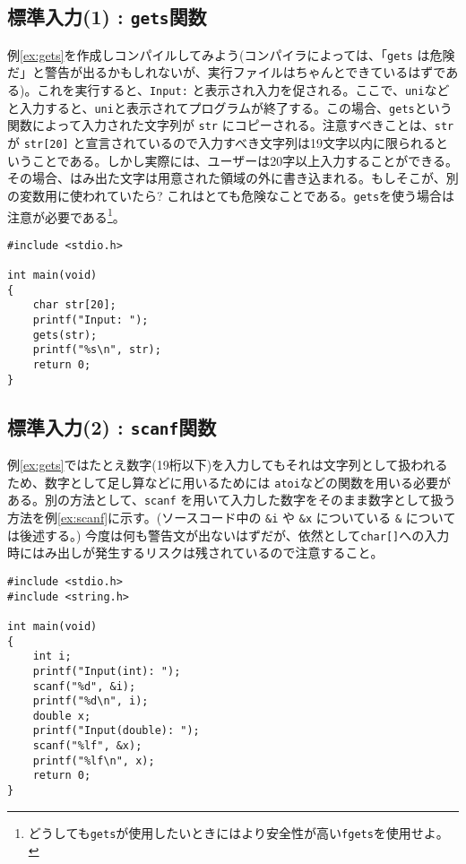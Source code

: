 \subsection{標準入力(1) : \texttt{gets}関数}
例\ref{ex:gets}を作成しコンパイルしてみよう(コンパイラによっては、「\texttt{gets} は危険だ」と警告が出るかもしれないが、実行ファイルはちゃんとできているはずである)。これを実行すると、\texttt{Input:} と表示され入力を促される。ここで、\texttt{uni}などと入力すると、\texttt{uni}と表示されてプログラムが終了する。この場合、\texttt{gets}という関数によって入力された文字列が \texttt{str} にコピーされる。注意すべきことは、\texttt{str} が \texttt{str[20]} と宣言されているので入力すべき文字列は19文字以内に限られるということである。しかし実際には、ユーザーは20字以上入力することができる。その場合、はみ出た文字は用意された領域の外に書き込まれる。もしそこが、別の変数用に使われていたら? これはとても危険なことである。\texttt{gets}を使う場合は注意が必要である\footnote{どうしても\texttt{gets}が使用したいときにはより安全性が高い\texttt{fgets}を使用せよ。}。
\begin{reidai}\label{ex:gets}
    \begin{verbatim}
#include <stdio.h>

int main(void)
{
    char str[20];
    printf("Input: ");
    gets(str);
    printf("%s\n", str);
    return 0;
}
\end{verbatim}
\end{reidai}

\subsection{標準入力(2) : \texttt{scanf}関数}
例\ref{ex:gets}ではたとえ数字(19桁以下)を入力してもそれは文字列として扱われるため、数字として足し算などに用いるためには \texttt{atoi}などの関数を用いる必要がある。別の方法として、\texttt{scanf} を用いて入力した数字をそのまま数字として扱う方法を例\ref{ex:scanf}に示す。(ソースコード中の \texttt{\&i} や \texttt{\&x} についている \texttt{\&} については後述する。)
今度は何も警告文が出ないはずだが、依然として\texttt{char[]}への入力時にはみ出しが発生するリスクは残されているので注意すること。
\begin{reidai}\label{ex:scanf}
    \begin{verbatim}
#include <stdio.h>
#include <string.h>

int main(void)
{
    int i;
    printf("Input(int): ");
    scanf("%d", &i);
    printf("%d\n", i);
    double x;
    printf("Input(double): ");
    scanf("%lf", &x);
    printf("%lf\n", x);
    return 0;
}
\end{verbatim}
\end{reidai}

